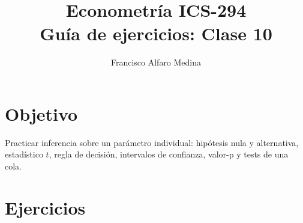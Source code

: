 \documentclass[11pt]{article}
\title{Econometría ICS-294\\Guía de ejercicios: Clase 10}
\author{Francisco Alfaro Medina}
\date{}
\begin{document}
\maketitle

\section*{Objetivo}

Practicar inferencia sobre un parámetro individual: hipótesis nula y alternativa, estadístico \(t\), regla de decisión, intervalos de confianza, valor-p y tests de una cola.

\section*{Ejercicios}
\end{document}
